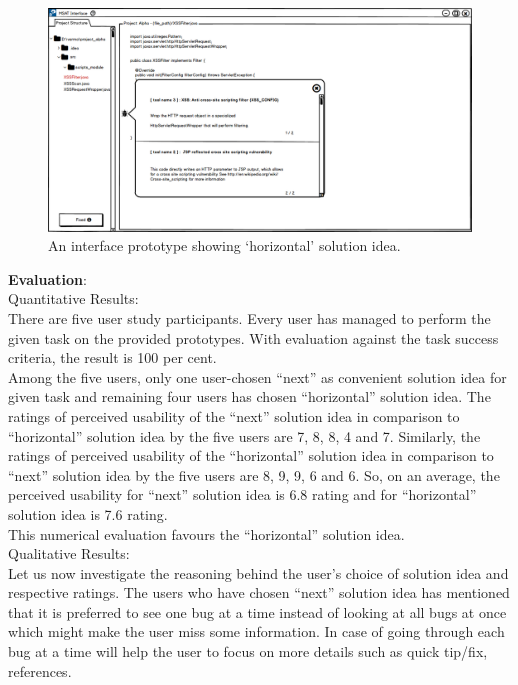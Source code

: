 \begin{figure}[hbt!]
	\centering
	\includegraphics[width=\linewidth]{figures/solution_ideas_snaps/S31_horizontal}
	\caption{An interface prototype showing ‘horizontal’ solution idea.}
	\label{fig:S31_horizontal2}
\end{figure} 


\textbf{Evaluation}: \\

Quantitative Results: \\

There are five user study participants. Every user has managed to perform the given task on the provided prototypes. With evaluation against the task success criteria, the result is 100 per cent. \\

Among the five users, only one user-chosen “next” as convenient solution idea for given task and remaining four users has chosen “horizontal” solution idea. The ratings of perceived usability of the “next” solution idea in comparison to “horizontal” solution idea by the five users are 7, 8, 8, 4 and 7. Similarly, the ratings of perceived usability of the “horizontal” solution idea in comparison to “next” solution idea by the five users are 8, 9, 9, 6 and 6. So, on an average, the perceived usability for “next” solution idea is 6.8 rating and for “horizontal” solution idea is 7.6 rating. \\

This numerical evaluation favours the “horizontal” solution idea. \\

Qualitative Results: \\

Let us now investigate the reasoning behind the user’s choice of solution idea and respective ratings. The users who have chosen “next” solution idea has mentioned that it is preferred to see one bug at a time instead of looking at all bugs at once which might make the user miss some information. In case of going through each bug at a time will help the user to focus on more details such as quick tip/fix, references. \\


